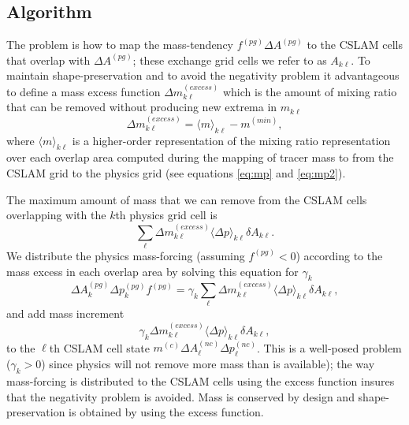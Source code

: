 \subsection{Algorithm}
The problem is how to map the mass-tendency $f^{(pg)}\Delta A^{(pg)}$ to the CSLAM cells that overlap with $\Delta A^{(pg)}$; these exchange grid cells we refer to as $A_{k\ell}$. To maintain shape-preservation and to avoid the negativity problem it advantageous to define a mass excess function $\Delta m_{k\ell}^{(excess)}$ which is the amount of mixing ratio that can be removed without producing new extrema in $m_{k\ell}$
\begin{equation}
\Delta m^{(excess)}_{k\ell}=\langle m\rangle_{k\ell}-m^{(min)},
\end{equation}
where $\langle m\rangle_{k\ell}$ is a higher-order representation of the mixing ratio representation over each overlap area computed during the mapping of tracer mass to from the CSLAM grid to the physics grid (see equations \eqref{eq:mp} and \eqref{eq:mp2}). 

The maximum amount of mass that we can remove from the CSLAM cells overlapping with the $k$th physics grid cell is
\begin{equation}
\sum_\ell \Delta m^{(excess)}_{k\ell}\langle \Delta p\rangle_{k\ell} \delta A_{k\ell}.
\end{equation}
We distribute the physics mass-forcing (assuming $f^{(pg)}<0$) according to the mass excess in each overlap area by solving this equation for $\gamma_k$
\begin{equation}
\Delta A_k^{(pg)}\Delta p_k^{(pg)}f^{(pg)}=\gamma_k \sum_\ell \Delta m^{(excess)}_{k\ell}\langle \Delta p\rangle_{k\ell} \delta A_{k\ell},
\end{equation}
and add mass increment {\color{red}{[check signs!]}}
\begin{equation}
\gamma_k \Delta m^{(excess)}_{k\ell}\langle \Delta p\rangle_{k\ell} \delta A_{k\ell},
\end{equation}
to the $\ell$th CSLAM cell state $m^{(c)}\Delta A^{(nc)}_\ell \Delta p^{(nc)}_\ell$. This is a well-posed problem ($\gamma_k>0$) since physics will not remove more mass than is available); the way mass-forcing is distributed to the CSLAM cells using the excess function insures that the negativity problem is avoided. Mass is conserved by design and shape-preservation is obtained by using the excess function.

